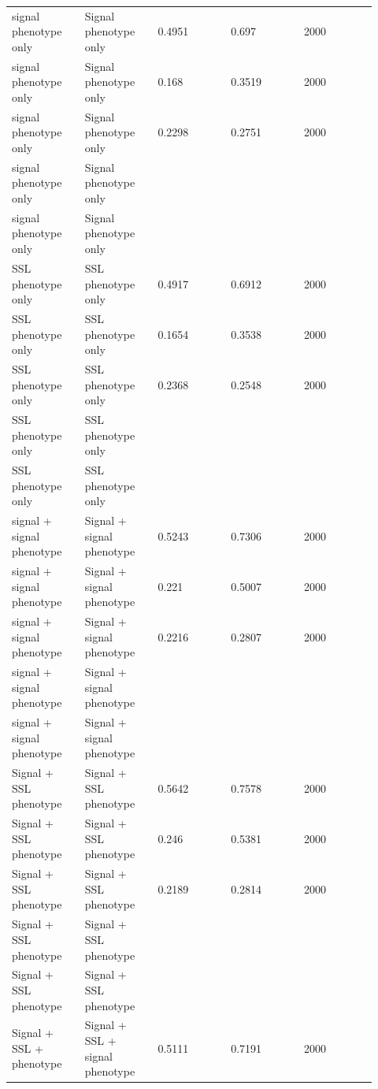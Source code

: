 \documentclass[utf8]{frontiers_suppmat}
\begin{document}
\begin{landscape}
\begin{longtable}{L{0.184\linewidth} L{0.184\linewidth} L{0.184\linewidth} L{0.184\linewidth} L{0.184\linewidth}}
signal phenotype only & Signal phenotype only & 0.\allowbreak{}4951 & 0.\allowbreak{}697 & 2000 \\
signal phenotype only & Signal phenotype only & 0.\allowbreak{}168 & 0.\allowbreak{}3519 & 2000 \\
signal phenotype only & Signal phenotype only & 0.\allowbreak{}2298 & 0.\allowbreak{}2751 & 2000 \\
signal phenotype only & Signal phenotype only &  &  &  \\
signal phenotype only & Signal phenotype only &  &  &  \\
SSL phenotype only & SSL phenotype only & 0.\allowbreak{}4917 & 0.\allowbreak{}6912 & 2000 \\
SSL phenotype only & SSL phenotype only & 0.\allowbreak{}1654 & 0.\allowbreak{}3538 & 2000 \\
SSL phenotype only & SSL phenotype only & 0.\allowbreak{}2368 & 0.\allowbreak{}2548 & 2000 \\
SSL phenotype only & SSL phenotype only &  &  &  \\
SSL phenotype only & SSL phenotype only &  &  &  \\
signal + signal phenotype & Signal + signal phenotype & 0.\allowbreak{}5243 & 0.\allowbreak{}7306 & 2000 \\
signal + signal phenotype & Signal + signal phenotype & 0.\allowbreak{}221 & 0.\allowbreak{}5007 & 2000 \\
signal + signal phenotype & Signal + signal phenotype & 0.\allowbreak{}2216 & 0.\allowbreak{}2807 & 2000 \\
signal + signal phenotype & Signal + signal phenotype &  &  &  \\
signal + signal phenotype & Signal + signal phenotype &  &  &  \\
Signal + SSL phenotype & Signal + SSL phenotype & 0.\allowbreak{}5642 & 0.\allowbreak{}7578 & 2000 \\
Signal + SSL phenotype & Signal + SSL phenotype & 0.\allowbreak{}246 & 0.\allowbreak{}5381 & 2000 \\
Signal + SSL phenotype & Signal + SSL phenotype & 0.\allowbreak{}2189 & 0.\allowbreak{}2814 & 2000 \\
Signal + SSL phenotype & Signal + SSL phenotype &  &  &  \\
Signal + SSL phenotype & Signal + SSL phenotype &  &  &  \\
Signal + SSL + phenotype & Signal + SSL + signal phenotype & 0.\allowbreak{}5111 & 0.\allowbreak{}7191 & 2000 \\

\end{longtable}
\end{landscape}
\end{document}
